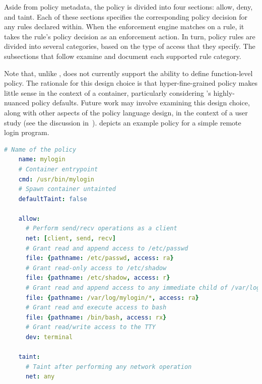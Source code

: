 Aside from policy metadata, the policy is divided into four sections: allow, deny, and
taint. Each of these sections specifies the corresponding policy decision for any rules
declared within. When the \bpfcontain{} enforcement engine matches on a rule, it takes the
rule's policy decision as an enforcement action. In turn, policy rules are divided into
several categories, based on the type of access that they specify. The subsections that
follow examine and document each supported rule category.

Note that, unlike \bpfbox{}, \bpfcontain{} does not currently support the ability to
define function-level policy. The rationale for this design choice is that
hyper-fine-grained policy makes little sense in the context of a container, particularly
considering \bpfcontain{}'s highly-nuanced policy defaults. Future work may involve
examining this design choice, along with other aspects of the \bpfcontain{} policy
language design, in the context of a user study (see the discussion
in~).  depicts an example
\bpfcontain{} policy for a simple remote login program.

\begin{lstlisting}[language=yaml, gobble=4,
  caption={[An example \bpfcontain{} policy  written in YAML]
    An example \bpfcontain{} policy for a simple remote login program, written in YAML.
    This example offers a fairly complete idea of the \bpfcontain{} policy language's
    various features. Note that, in the context of a Docker container, all of the
    \enquote{file rules} under this policy would be unnecessary; they would be implicitly
    covered by the container's namespace membership. The reader is encouraged to compare
    this policy with the policy depicted in \Cref{lst:bpfbox-policy-example} on page
    \pageref{lst:bpfbox-policy-example}.
  },
  label={lst:bpfcontain-policy-example}, float]
    # Name of the policy
    name: mylogin
    # Container entrypoint
    cmd: /usr/bin/mylogin
    # Spawn container untainted
    defaultTaint: false

    allow:
      # Perform send/recv operations as a client
      net: [client, send, recv]
      # Grant read and append access to /etc/passwd
      file: {pathname: /etc/passwd, access: ra}
      # Grant read-only access to /etc/shadow
      file: {pathname: /etc/shadow, access: r}
      # Grant read and append access to any immediate child of /var/log/mylogin
      file: {pathname: /var/log/mylogin/*, access: ra}
      # Grant read and execute access to bash
      file: {pathname: /bin/bash, access: rx}
      # Grant read/write access to the TTY
      dev: terminal

    taint:
      # Taint after performing any network operation
      net: any
\end{lstlisting}

